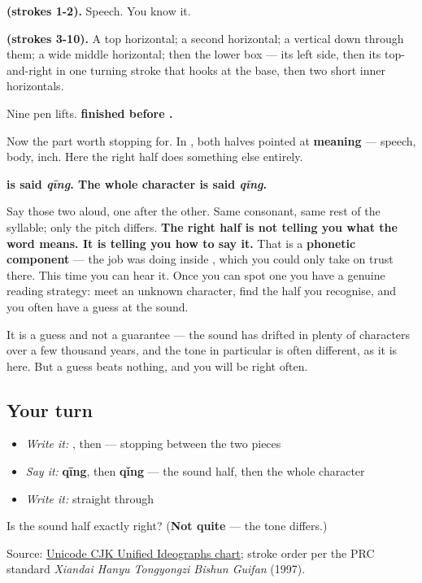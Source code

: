 \textbf{ (strokes 1-2).} Speech. You know it.

\textbf{ (strokes 3-10).} A top horizontal; a second horizontal; a vertical down through them; a wide middle horizontal; then the lower box — its left side, then its top-and-right in one turning stroke that hooks at the base, then two short inner horizontals.

Nine pen lifts. \textbf{ finished before .}

Now the part worth stopping for. In , both halves pointed at \textbf{meaning} — speech, body, inch. Here the right half does something else entirely.

\textbf{ is said \emph{qīng}. The whole character is said \emph{qǐng}.}

Say those two aloud, one after the other. Same consonant, same rest of the syllable; only the pitch differs. \textbf{The right half is not telling you what the word means. It is telling you how to say it.} That is a \textbf{phonetic component} — the job  was doing inside , which you could only take on trust there. This time you can hear it. Once you can spot one you have a genuine reading strategy: meet an unknown character, find the half you recognise, and you often have a guess at the sound.

It is a guess and not a guarantee — the sound has drifted in plenty of characters over a few thousand years, and the tone in particular is often different, as it is here. But a guess beats nothing, and you will be right often.

\subsection*{Your turn}
\begin{itemize}
\raggedright
  \item \emph{Write it:} , then  — stopping between the two pieces
  \item \emph{Say it:} \textbf{qīng}, then \textbf{qǐng} — the sound half, then the whole character
  \item \emph{Write it:}  straight through
\end{itemize}

\begin{tcolorbox}[breakable,colback=teal!4,colframe=teal!35!black,title={Before you move on}]
Is the sound half exactly right? (\textbf{Not quite} — the tone differs.)

Source: \href{https://www.unicode.org/charts/PDF/U4E00.pdf}{Unicode CJK Unified Ideographs chart}; stroke order per the PRC standard \emph{Xiandai Hanyu Tongyongzi Bishun Guifan} (1997).
\end{tcolorbox}
